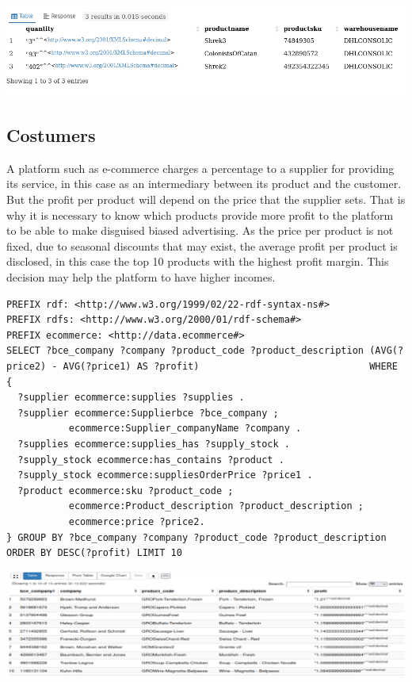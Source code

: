 \documentclass{article}
\begin{document}
\begin{center}
   \includegraphics[scale=0.5]{OISreport-warehouse-query.png}
\end{center}



\subsection{Costumers}
A platform such as e-commerce charges a percentage to a supplier for providing its service, in this case as an intermediary between its product and the customer. But the profit per product will depend on the price that the supplier sets. That is why it is necessary to know which products provide more profit to the platform to be able to make disguised biased advertising. As the price per product is not fixed, due to seasonal discounts that may exist, the average profit per product is disclosed, in this case the top 10 products with the highest profit margin. This decision may help the platform to have higher incomes. \\

\begin{lstlisting}[breaklines, frame=single]
PREFIX rdf: <http://www.w3.org/1999/02/22-rdf-syntax-ns#>
PREFIX rdfs: <http://www.w3.org/2000/01/rdf-schema#>
PREFIX ecommerce: <http://data.ecommerce#>
SELECT ?bce_company ?company ?product_code ?product_description (AVG(?price2) - AVG(?price1) AS ?profit)                              WHERE {
  ?supplier ecommerce:supplies ?supplies .
  ?supplier ecommerce:Supplierbce ?bce_company ;
           ecommerce:Supplier_companyName ?company .
  ?supplies ecommerce:supplies_has ?supply_stock .
  ?supply_stock ecommerce:has_contains ?product .
  ?supply_stock ecommerce:suppliesOrderPrice ?price1 .
  ?product ecommerce:sku ?product_code ;
           ecommerce:Product_description ?product_description ;
           ecommerce:price ?price2.
} GROUP BY ?bce_company ?company ?product_code ?product_description ORDER BY DESC(?profit) LIMIT 10
\end{lstlisting}

\begin{center}
   \includegraphics[scale=0.25]{OISreport-costumer-query.png}
\end{center}
\end{document}
